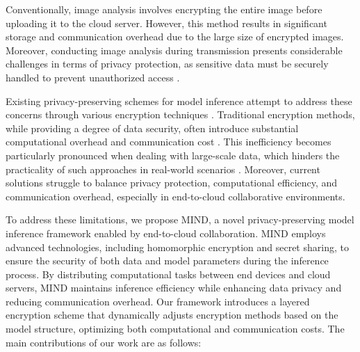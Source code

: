 \documentclass[conference]{IEEEtran}
\begin{document}
Conventionally, image analysis involves encrypting the entire image before uploading it to the cloud server. However, this method results in significant storage and communication overhead due to the large size of encrypted images. Moreover, conducting image analysis during transmission presents considerable challenges in terms of privacy protection, as sensitive data must be securely handled to prevent unauthorized access \cite{cui2018security}\cite{van2014datafication}.

Existing privacy-preserving schemes for model inference attempt to address these concerns through various encryption techniques \cite{fu2020vfl}\cite{yang2012efficient}. Traditional encryption methods, while providing a degree of data security, often introduce substantial computational overhead and communication cost \cite{kerschbaum2012outsourced}. This inefficiency becomes particularly pronounced when dealing with large-scale data, which hinders the practicality of such approaches in real-world scenarios \cite{li2015encdb}. Moreover, current solutions struggle to balance privacy protection, computational efficiency, and communication overhead, especially in end-to-cloud collaborative environments.

To address these limitations, we propose MIND, a novel privacy-preserving model inference framework enabled by end-to-cloud collaboration. MIND employs advanced technologies, including homomorphic encryption and secret sharing, to ensure the security of both data and model parameters during the inference process. By distributing computational tasks between end devices and cloud servers, MIND maintains inference efficiency while enhancing data privacy and reducing communication overhead. Our framework introduces a layered encryption scheme that dynamically adjusts encryption methods based on the model structure, optimizing both computational and communication costs. The main contributions of our work are as follows:
\end{document}
